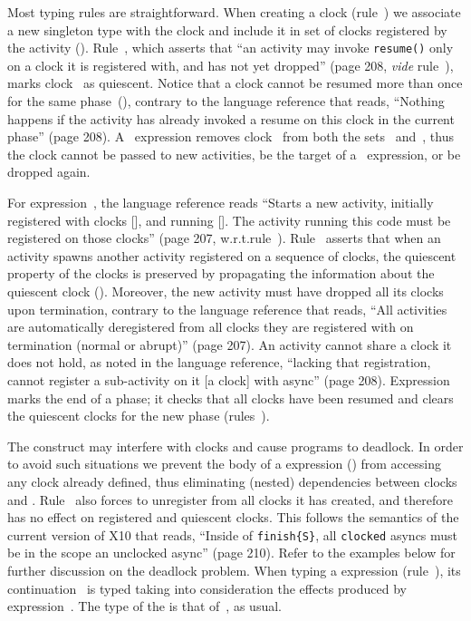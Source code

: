 Most typing rules are straightforward.
When creating a clock (rule~\Tmake) we associate a new singleton type
 with the clock and include it in set of clocks registered by
the activity ().
Rule~, which asserts that ``an activity may invoke
\texttt{resume()} only on a clock it is registered with, and has not
yet dropped'' (page 208, \textit{vide} rule~\Tvar), marks clock~
as quiescent.
Notice that a clock cannot be resumed more than once for the same
phase~(), contrary to the language
reference that reads, ``Nothing happens if the activity has already
invoked a resume on this clock in the current phase'' (page 208).
A~ expression removes clock~ from both the sets~ and~, thus the clock cannot be passed to new
activities, be the target of a~ expression, or be dropped
again.

For expression~, the language reference reads
``Starts a new activity, initially registered with clocks [],
and running []. The activity running this code must be registered
on those clocks'' (page 207, w.r.t.\@ rule~).
Rule~ asserts that when an activity spawns another
activity registered on a sequence of clocks, the quiescent property of
the clocks is preserved by propagating the information about the
quiescent clock  ().
Moreover, the new activity must have dropped all its clocks upon
termination, contrary to the language reference that reads, ``All
activities are automatically deregistered from all clocks they are
registered with on termination (normal or abrupt)'' (page 207).
An activity cannot share a clock it does not hold, as noted in the
language reference, ``lacking that registration, cannot register a
sub-activity on it [a clock] with async'' (page 208).
Expression  marks the end of a phase; it checks
that all clocks have been resumed and clears
the quiescent clocks for the new phase (rules~).


The  construct may interfere with clocks and cause
programs to deadlock.
In order to avoid such situations we prevent the body of
a  expression () from accessing any clock already
defined, thus eliminating (nested) dependencies between clocks
and .
Rule~\Tfinish{} also forces  to unregister from all clocks it has
created, and therefore  has no effect on registered and
quiescent clocks.
This follows the semantics of the current version of X10 that reads,
``Inside of \texttt{finish\{S\}}, all \texttt{clocked} asyncs must be
in the scope an unclocked async'' (page 210).
Refer to the examples below for further discussion on the deadlock 
problem.
When typing a  expression (rule~\Tlet), its continuation~
is typed taking into consideration the effects produced by
expression~.
The type of the  is that of~, as usual.

